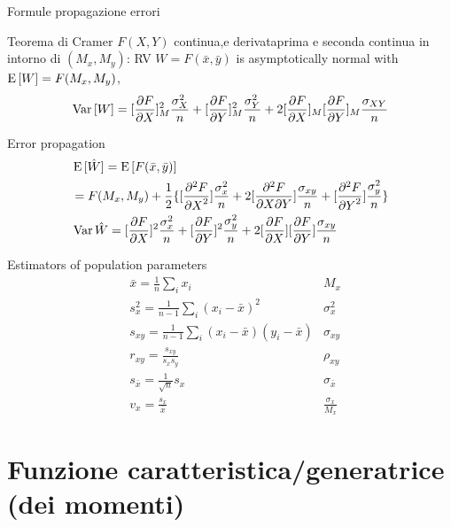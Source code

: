 \begin{frame}{Formule propagazione errori}
\begin{block}{Teorema di Cramer}
$F(X,Y)$ continua,e derivataprima e seconda continua in intorno di $(M_x,M_y)$: RV $W=F(\bar{x},\bar{y})$ is asymptotically normal with $\E{[W]}=F(M_x,M_y)$,
\[\var{[W]}=[\PDy{X}{F}]_M^2\frac{\sigma^2_X}{n}+[\PDy{Y}{F}]_M^2\frac{\sigma^2_Y}{n}+2[\PDy{X}{F}]_M[\PDy{Y}{F}]_M\frac{\sigma_{XY}}{n}\]
\end{block}
\begin{block}{Error propagation}
\begin{align*}
&\E{[\hat{W}]}=\E{[F(\bar{x},\bar{y})]}\\
&=F(M_x,M_y)+\frac{1}{2}\{[\PtwoDy{X}{F}]\frac{\sigma_x^2}{n}+2[\PtwoMDy{X}{Y}{F}]\frac{\sigma_{xy}}{n}+[\PtwoDy{Y}{F}]\frac{\sigma_y^2}{n}\}\\
&\var{\hat{W}}=[\PDy{X}{F}]^2\frac{\sigma_x^2}{n}+[\PDy{Y}{F}]^2\frac{\sigma_y^2}{n}+2[\PDy{X}{F}][\PDy{Y}{F}]\frac{\sigma_{xy}}{n}
\end{align*}
\end{block}
\end{frame}

\begin{frame}{Estimators of population parameters}
\begin{align*}
&\bar{x}=\frac{1}{n}\sum_ix_i&M_x\tag{Mean: first moment}\\
&s_x^2=\frac{1}{n-1}\sum_i(x_i-\bar{x})^2&\sigma_x^2\tag{var: 2nd central moment}\\
&s_{xy}=\frac{1}{n-1}\sum_i(x_i-\bar{x})(y_i-\bar{x})&\sigma_{xy}\tag{covariance}\\
&r_{xy}=\frac{s_{xy}}{s_xs_y}&\rho_{xy}\tag{correlation coefficient}\\
&s_{\bar{x}}=\frac{1}{\sqrt{n}}s_x&\sigma_{\bar{x}}\tag{std deviation of average}\\
&v_x=\frac{s_x}{\bar{x}}&\frac{\sigma_x}{M_x}\tag{relative standard deviation}
\end{align*}
\end{frame}

\section{Funzione caratteristica/generatrice (dei momenti)}

